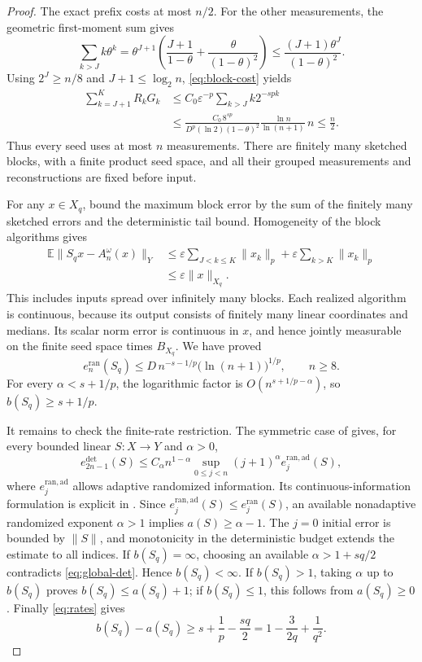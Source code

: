 \documentclass[11pt]{article}
\newcommand{\E}{\mathbb E}
\newcommand{\ed}{e^{\mathrm{det}}}
\newcommand{\er}{e^{\mathrm{ran}}}
\begin{document}
\begin{proof}
The exact prefix costs at most \(n/2\). For the other measurements,
the geometric first-moment sum gives
\[
 \sum_{k>J}k\theta^k
 =\theta^{J+1}\left(\frac{J+1}{1-\theta}
                           +\frac{\theta}{(1-\theta)^2}\right)
 \le\frac{(J+1)\theta^J}{(1-\theta)^2}.
\]
Using \(2^J\ge n/8\) and \(J+1\le\log_2n\), \eqref{eq:block-cost} yields
\[
 \begin{split}
 \sum_{k=J+1}^{K}R_kG_k
 &\le C_0\varepsilon^{-p}\sum_{k>J}k2^{-spk}\\
 &\le\frac{C_0\,8^{sp}}{D^p(\ln2)(1-\theta)^2}
                    \frac{\ln n}{\ln(n+1)}\,n
 \le\frac n2.
 \end{split}
\]
Thus every seed uses at most \(n\) measurements. There are finitely many
sketched blocks, with a finite product seed space, and all their grouped
measurements and reconstructions are fixed before input.

For any \(x\in X_q\), bound the maximum block error by the sum of
the finitely many sketched errors and the deterministic tail bound.
Homogeneity of the block algorithms gives
\[
 \begin{split}
 \E\|S_qx-A_n^\omega(x)\|_Y
 &\le\varepsilon\sum_{J<k\le K}\|x_k\|_p
       +\varepsilon\sum_{k>K}\|x_k\|_p\\
 &\le\varepsilon\|x\|_{X_q}.
 \end{split}
\]
This includes inputs spread over infinitely many blocks. Each realized
algorithm is continuous, because its output consists of finitely many
linear coordinates and medians. Its scalar norm error is continuous in
\(x\), and hence jointly measurable on the finite seed space times \(B_{X_q}\).
We have proved
\begin{equation}\label{eq:global-ran}
 \er_n(S_q)\le D\,n^{-s-1/p}\bigl(\ln(n+1)\bigr)^{1/p},
 \qquad n\ge8.
\end{equation}
For every \(\alpha<s+1/p\), the logarithmic factor is
\(O(n^{s+1/p-\alpha})\), so \(b(S_q)\ge s+1/p\).

It remains to check the finite-rate restriction. The symmetric case of
\cite[Corollary 14]{KNU} gives, for every bounded linear \(S:X\to Y\)
and \(\alpha>0\),
\begin{equation}\label{eq:universal}
 \ed_{2n-1}(S)\le C_\alpha n^{1-\alpha}
          \sup_{0\le j<n}(j+1)^\alpha e_j^{\mathrm{ran,ad}}(S),
\end{equation}
where \(e_j^{\mathrm{ran,ad}}\) allows adaptive randomized information.
Its continuous-information formulation is explicit in
\cite[Section 6.3]{KNU}. Since
\(e_j^{\mathrm{ran,ad}}(S)\le\er_j(S)\), an available nonadaptive
randomized exponent \(\alpha>1\) implies \(a(S)\ge\alpha-1\).
The \(j=0\) initial error is bounded by \(\|S\|\), and monotonicity in the
deterministic budget extends the estimate to all indices.
If \(b(S_q)=\infty\), choosing an available \(\alpha>1+sq/2\)
contradicts \eqref{eq:global-det}. Hence \(b(S_q)<\infty\). If
\(b(S_q)>1\), taking \(\alpha\) up to \(b(S_q)\) proves
\(b(S_q)\le a(S_q)+1\); if \(b(S_q)\le1\), this follows from
\(a(S_q)\ge0\).
Finally \eqref{eq:rates} gives
\[
 b(S_q)-a(S_q)\ge s+\frac1p-\frac{sq}{2}
                    =1-\frac3{2q}+\frac1{q^2}.
\]
\end{proof}
\end{document}
